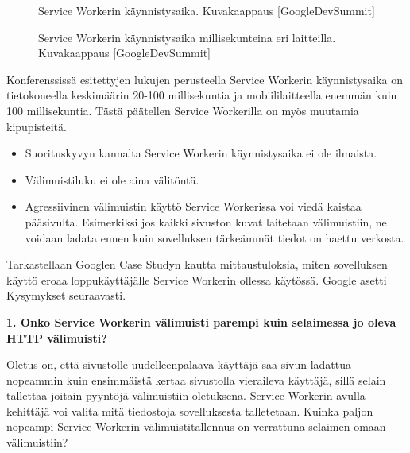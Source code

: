\documentclass{tktltiki}
\begin{document}
\begin{figure}[h]
\begin{center}
\caption{Service Workerin käynnistysaika. Kuvakaappaus [GoogleDevSummit]}
\label{SW bootup time}
\end{center}
\end{figure}

\begin{figure}[h]
\begin{center}
\caption{Service Workerin käynnistysaika millisekunteina eri laitteilla. Kuvakaappaus [GoogleDevSummit]}
\label{SW bootup time on device}
\end{center}
\end{figure}

\clearpage

Konferenssissä esitettyjen lukujen perusteella Service Workerin käynnistysaika on tietokoneella keskimäärin 20-100 millisekuntia ja mobiililaitteella enemmän kuin 100 millisekuntia. Tästä päätellen Service Workerilla on myös muutamia kipupisteitä.

\begin{itemize}
  \item Suorituskyvyn kannalta Service Workerin käynnistysaika ei ole ilmaista. 
  \item Välimuistiluku ei ole aina välitöntä.
  \item Agressiivinen välimuistin käyttö Service Workerissa voi viedä kaistaa pääsivulta. Esimerkiksi jos kaikki sivuston kuvat laitetaan välimuistiin, ne voidaan ladata ennen kuin sovelluksen tärkeämmät tiedot on haettu verkosta.
\end{itemize}

Tarkastellaan Googlen Case Studyn kautta mittaustuloksia, miten sovelluksen käyttö eroaa loppukäyttäjälle Service Workerin ollessa käytössä. Google asetti Kysymykset seuraavasti.

\textbf{1. Onko Service Workerin välimuisti parempi kuin selaimessa jo oleva HTTP välimuisti?}

Oletus on, että sivustolle uudelleenpalaava käyttäjä saa sivun ladattua nopeammin kuin ensimmäistä kertaa sivustolla vieraileva käyttäjä, sillä selain tallettaa joitain pyyntöjä välimuistiin oletuksena. Service Workerin avulla kehittäjä voi valita mitä tiedostoja sovelluksesta talletetaan. Kuinka paljon nopeampi Service Workerin välimuistitallennus on verrattuna selaimen omaan välimuistiin?
\end{document}
